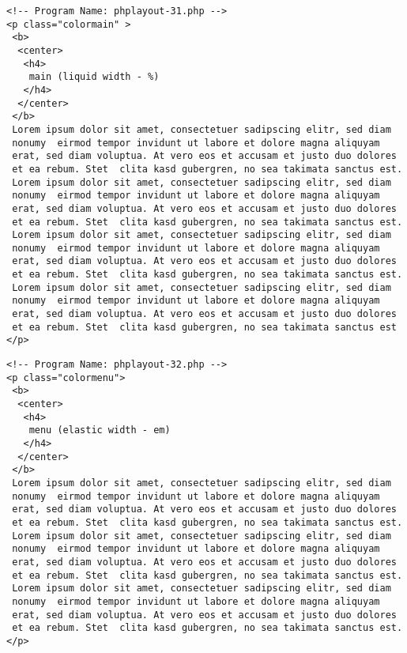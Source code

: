 \documentclass[12pt,a4paper,twosides,ngerman]{scrbook}
\begin{document}
\begin{center}
\begin{minipage}[t]{155mm}
\begin{lstlisting}[captionpos=b, caption=Layout - phplayout-31.php]
<!-- Program Name: phplayout-31.php -->
<p class="colormain" >
 <b>
  <center>
   <h4>
    main (liquid width - %)
   </h4>
  </center>
 </b>
 Lorem ipsum dolor sit amet, consectetuer sadipscing elitr, sed diam
 nonumy  eirmod tempor invidunt ut labore et dolore magna aliquyam
 erat, sed diam voluptua. At vero eos et accusam et justo duo dolores
 et ea rebum. Stet  clita kasd gubergren, no sea takimata sanctus est.
 Lorem ipsum dolor sit amet, consectetuer sadipscing elitr, sed diam
 nonumy  eirmod tempor invidunt ut labore et dolore magna aliquyam
 erat, sed diam voluptua. At vero eos et accusam et justo duo dolores
 et ea rebum. Stet  clita kasd gubergren, no sea takimata sanctus est.
 Lorem ipsum dolor sit amet, consectetuer sadipscing elitr, sed diam
 nonumy  eirmod tempor invidunt ut labore et dolore magna aliquyam
 erat, sed diam voluptua. At vero eos et accusam et justo duo dolores
 et ea rebum. Stet  clita kasd gubergren, no sea takimata sanctus est.
 Lorem ipsum dolor sit amet, consectetuer sadipscing elitr, sed diam
 nonumy  eirmod tempor invidunt ut labore et dolore magna aliquyam
 erat, sed diam voluptua. At vero eos et accusam et justo duo dolores
 et ea rebum. Stet  clita kasd gubergren, no sea takimata sanctus est
</p>
\end{lstlisting}
\end{minipage}
\end{center} 			

\begin{center}
\begin{minipage}[t]{155mm}
\begin{lstlisting}[captionpos=b, caption=Layout - phplayout-32.php]
<!-- Program Name: phplayout-32.php -->
<p class="colormenu">
 <b>
  <center>
   <h4>
    menu (elastic width - em)
   </h4>
  </center>
 </b>
 Lorem ipsum dolor sit amet, consectetuer sadipscing elitr, sed diam
 nonumy  eirmod tempor invidunt ut labore et dolore magna aliquyam
 erat, sed diam voluptua. At vero eos et accusam et justo duo dolores
 et ea rebum. Stet  clita kasd gubergren, no sea takimata sanctus est.
 Lorem ipsum dolor sit amet, consectetuer sadipscing elitr, sed diam
 nonumy  eirmod tempor invidunt ut labore et dolore magna aliquyam
 erat, sed diam voluptua. At vero eos et accusam et justo duo dolores
 et ea rebum. Stet  clita kasd gubergren, no sea takimata sanctus est.
 Lorem ipsum dolor sit amet, consectetuer sadipscing elitr, sed diam
 nonumy  eirmod tempor invidunt ut labore et dolore magna aliquyam
 erat, sed diam voluptua. At vero eos et accusam et justo duo dolores
 et ea rebum. Stet  clita kasd gubergren, no sea takimata sanctus est.
</p>
\end{lstlisting}
\end{minipage}
\end{center} 
 
\end{document}
